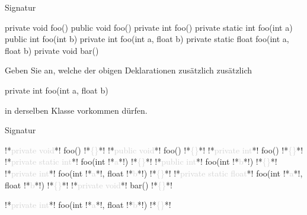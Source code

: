 \begin{frame}[fragile]{Signatur}
    \begin{exercise}
    \begin{plainjava}
private void foo() {}
public void foo() {}
private int foo() {}
private static int foo(int a) {}
public int foo(int b) {}
private int foo(int a, float b) {}
private static float foo(int a, float b) {}
private void bar() {}
    \end{plainjava}
    Geben Sie an, welche der obigen Deklarationen zusätzlich zusätzlich
    \begin{plainjava}
private int foo(int a, float b) {}
    \end{plainjava}
    in derselben Klasse vorkommen dürfen.
    \end{exercise}
\end{frame}
\begin{frame}[fragile]{Signatur}
    \begin{solve}
    \begin{plainjava}
!*\textcolor{lightgray}{private void}*! foo() !*\textcolor{lightgray}{\{\}}*!
!*\textcolor{lightgray}{public void}*! foo() !*\textcolor{lightgray}{\{\}}*!
!*\textcolor{lightgray}{private int}*! foo() !*\textcolor{lightgray}{\{\}}*!
!*\textcolor{lightgray}{private static int}*! foo(int !*\textcolor{lightgray}{a}*!) !*\textcolor{lightgray}{\{\}}*!
!*\textcolor{lightgray}{public int}*! foo(int !*\textcolor{lightgray}{b}*!) !*\textcolor{lightgray}{\{\}}*!
!*\textcolor{lightgray}{private int}*! foo(int !*\textcolor{lightgray}{a}*!, float !*\textcolor{lightgray}{b}*!) !*\textcolor{lightgray}{\{\}}*!
!*\textcolor{lightgray}{private static float}*! foo(int !*\textcolor{lightgray}{a}*!, float !*\textcolor{lightgray}{b}*!) !*\textcolor{lightgray}{\{\}}*!
!*\textcolor{lightgray}{private void}*! bar() !*\textcolor{lightgray}{\{\}}*!
    \end{plainjava}
    \bigskip
    \begin{plainjava}
!*\textcolor{lightgray}{private int}*! foo(int !*\textcolor{lightgray}{a}*!, float !*\textcolor{lightgray}{b}*!) !*\textcolor{lightgray}{\{\}}*!
    \end{plainjava}
    \end{solve}
\end{frame}
\addtocounter{solve}{-1}
